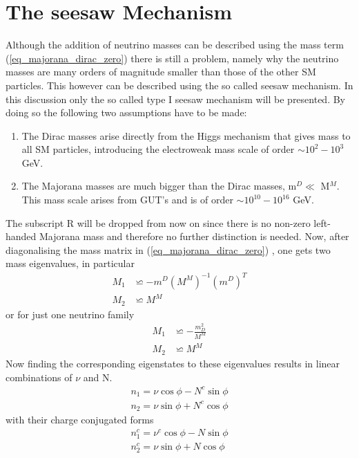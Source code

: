 \section{The seesaw Mechanism}
Although the addition of neutrino masses can be described using the mass term (\ref{eq_majorana_dirac_zero})
there is still a problem, namely why the neutrino masses are many orders of magnitude smaller than those of the other SM particles. This however can be described using the so called seesaw mechanism. In this discussion only the so called type I seesaw mechanism will be presented. By doing so the following two assumptions have to be made:
\begin{enumerate}
	\item The Dirac masses arise directly from the Higgs mechanism that gives mass to all SM particles, introducing the electroweak mass scale of order $\sim10^2-10^3$ GeV.
	\item The Majorana masses are much bigger than the Dirac masses, m$^D\ll$ M$^M$. This mass scale arises from GUT's and is of order $\sim10^{10}-10^{16}$ GeV.
\end{enumerate}
The subscript R will be dropped from now on since there is no non-zero left-handed Majorana mass and therefore no further distinction is needed.\newline\indent
Now, after diagonalising the mass matrix in (\ref{eq_majorana_dirac_zero}) \cite[pp. 2-3]{Lindner:2001hr}, one gets two mass eigenvalues, in particular
\begin{align*}
	M_1&\backsimeq-m^D{\left(M^M\right)}^{-1}{\left(m^D\right)}^{T}\\
	M_2&\backsimeq M^M
\end{align*}
or for just one neutrino family
\begin{align}
	M_1&\backsimeq -\frac{m_D^2}{M^M}
	\label{eq:light_neutrino}
	\\
	M_2&\backsimeq M^M
	\label{eq:heavy_neutrino}
\end{align}
Now finding the corresponding eigenstates to these eigenvalues results in linear combinations of $\nu$ and N.
\begin{align}
	n_{1}=\nu\cos\phi-N^c\sin\phi
	\label{eq:n1}
	\\
	n_{2}=\nu\sin\phi+N^c\cos\phi
	\label{eq:n2}
\end{align}
with their charge conjugated forms
\begin{align}
n_{1}^c=\nu^c\cos\phi-N\sin\phi
\label{eq:n1C}
\\
n_{2}^c=\nu\sin\phi+N\cos\phi
\label{eq:n2C}
\end{align}
